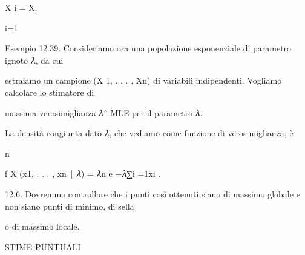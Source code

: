 \documentclass[a4paper,portrait,12pt]{article}
\begin{document}
\begin{flushleft}
X i = X.
\end{flushleft}


\begin{flushleft}
i=1
\end{flushleft}





\begin{flushleft}
Esempio 12.39. Consideriamo ora una popolazione esponenziale di parametro ignoto 𝜆, da cui
\end{flushleft}


\begin{flushleft}
estraiamo un campione (X 1, . . . , Xn) di variabili indipendenti. Vogliamo calcolare lo stimatore di
\end{flushleft}


\begin{flushleft}
massima verosimiglianza 𝜆ˆ MLE per il parametro 𝜆.
\end{flushleft}


\begin{flushleft}
La densit\`{a} congiunta dato 𝜆, che vediamo come funzione di verosimiglianza, \`{e}
\end{flushleft}


\begin{flushleft}
n
\end{flushleft}





\begin{flushleft}
f X (x1, . . . , xn ∣ 𝜆) = 𝜆n e $-$𝜆∑i =1xi .
\end{flushleft}


\begin{flushleft}
12.6. Dovremmo controllare che i punti così ottenuti siano di massimo globale e non siano punti di minimo, di sella
\end{flushleft}


\begin{flushleft}
o di massimo locale.
\end{flushleft}










\begin{flushleft}
STIME PUNTUALI
\end{flushleft}
\end{document}
